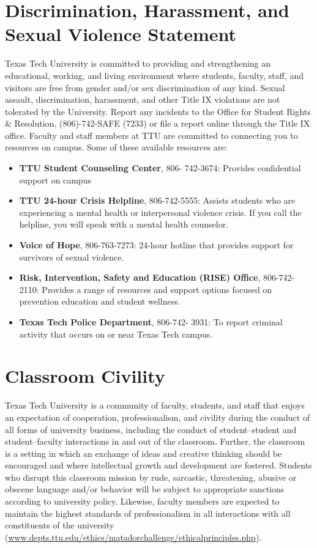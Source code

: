 \documentclass[12pt, notitlepage]{article}   	%
\begin{document}
{\section{Discrimination, Harassment, and Sexual Violence Statement}
Texas Tech University is committed to providing and strengthening an educational, working, and living environment where students, faculty, staff, and visitors are free from gender and/or sex discrimination of any kind. Sexual assault, discrimination, harassment, and other Title IX violations are not tolerated by the University. Report any incidents to the Office for Student Rights \& Resolution, (806)-742-SAFE (7233) or file a report online through the Title IX office. Faculty and staff members at TTU are committed to connecting you to resources on campus. Some of these available resources are:
\begin{itemize}
    \item \textbf{TTU Student Counseling Center}, 806- 742-3674: Provides confidential support on campus
    \item \textbf{TTU 24-hour Crisis Helpline}, 806-742-5555: Assists students who are experiencing a mental health or interpersonal violence crisis. If you call the helpline, you will speak with a mental health counselor.
    \item \textbf{Voice of Hope}, 806-763-7273: 24-hour hotline that provides support for survivors of sexual violence.
    \item \textbf{Risk, Intervention, Safety and Education (RISE) Office}, 806-742-2110: Provides a range of resources and support options focused on prevention education and student wellness.
    \item \textbf{Texas Tech Police Department}, 806-742- 3931: To report criminal activity that occurs on or near Texas Tech campus.
\end{itemize}

\section{Classroom Civility}
Texas Tech University is a community of faculty, students, and staff that enjoys an expectation of cooperation, professionalism, and civility during the conduct of all forms of university business, including the conduct of student–student and student–faculty interactions in and out of the classroom. Further, the classroom is a setting in which an exchange of ideas and creative thinking should be encouraged and where intellectual growth and development are fostered. Students who disrupt this classroom mission by rude, sarcastic, threatening, abusive or obscene language and/or behavior will be subject to appropriate sanctions according to university policy. Likewise, faculty members are expected to maintain the highest standards of professionalism in all interactions with all constituents of the university \newline (\href{www.depts.ttu.edu/ethics/matadorchallenge/ethicalprinciples.php}{www.depts.ttu.edu/ethics/matadorchallenge/ethicalprinciples.php}).

}
\end{document}
